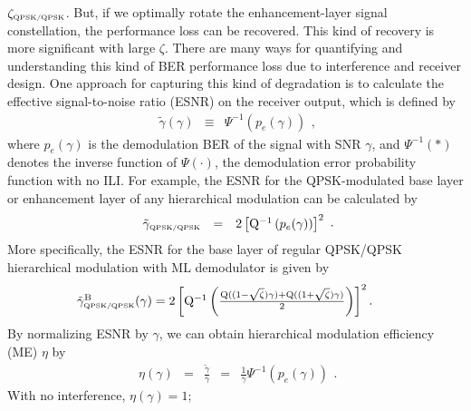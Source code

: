 \documentclass[10pt,fleqn, twocolumn]{IEEEtran}
\begin{document}
$\zeta_{\mbox{\tiny QPSK/QPSK}}$. But, if we optimally rotate the
enhancement-layer signal constellation, the performance loss can
be recovered. This kind of recovery is more significant with large
$\zeta$. There are many ways for quantifying and understanding
this kind of BER performance loss due to interference and receiver
design. One approach for capturing this kind of degradation is to
calculate the effective signal-to-noise ratio (ESNR) on the
receiver output, which is defined by
\begin{equation}
\begin{array}{rcl}
\tilde{\gamma}\left(\gamma\right)&\equiv&\Psi^{-1}\left(p_{e}(\gamma)\right)
\end{array},\label{eff_SNR}
\end{equation}
\noindent where $p_{e}(\gamma)$ is the demodulation BER of the
signal with SNR $\gamma$, and $\Psi^{-1}\left(\ast\right)$ denotes
the inverse function of $\Psi\left(\cdot\right)$, the demodulation
error probability function with no ILI. For example, the ESNR for
the QPSK-modulated base layer or enhancement layer of any
hierarchical modulation can be calculated by
\begin{equation}
\begin{array}{rcl}
\tilde{\gamma}_{\mbox{\tiny QPSK/QPSK}}&=&2\left[{\rm
Q}^{-1}\left(p_{e}(\gamma)\right)\right]^2
\end{array}.\label{eff_SNR_QPSK}
\end{equation}
\noindent More specifically, the ESNR for the base layer of
regular QPSK/QPSK hierarchical modulation with ML demodulator is
given by
\begin{equation}\hspace{-0.225in}
\begin{array}{l}
\tilde{\gamma}_{\mbox{\tiny QPSK/QPSK}}^{\rm
B}(\gamma)=2\left[{\rm Q}^{-1}\left(\frac{{\rm
Q}((1-\sqrt{\zeta})\gamma)+{\rm
Q}((1+\sqrt{\zeta})\gamma)}{2}\right)\right]^2.
\end{array}\label{eff_SNR_QPSK_QPSK}
\end{equation}
\noindent By normalizing ESNR by $\gamma$, we can obtain
hierarchical modulation efficiency (ME) $\eta$ by
\begin{equation}
\begin{array}{rcccl}
\eta\left(\gamma\right)&=&\frac{\tilde{\gamma}}{\gamma}&=&\frac{1}{\gamma}\Psi^{-1}\left(p_{e}(\gamma)\right)
\end{array}.\label{mod_eff}
\end{equation}
\noindent With no interference, $\eta\left(\gamma\right)=1$;
\end{document}
